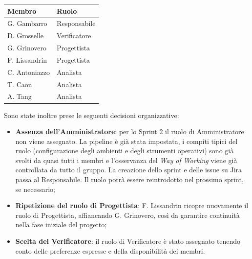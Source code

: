 \vspace{0.3cm}
\renewcommand{\arraystretch}{1.3}
\noindent
\begin{tabularx}{\textwidth}{|X|X|}
    \hline
    \textbf{Membro} & \textbf{Ruolo} \\
    \hline
    G. Gambarro & Responsabile \\
    \hline
    D. Grosselle & Verificatore \\
    \hline
    G. Grinovero & Progettista \\
    \hline
    F. Lissandrin & Progettista \\
    \hline
    C. Antoniazzo & Analista \\
    \hline
    T. Caon & Analista \\
    \hline
    A. Tang & Analista \\
    \hline
\end{tabularx}
\vspace{0.3cm}

\noindent Sono state inoltre prese le seguenti decisioni organizzative:
\begin{itemize}
    \item \textbf{Assenza dell'Amministratore}: per lo Sprint 2 il ruolo di Amministratore non viene assegnato. La pipeline è già stata impostata, i compiti tipici del ruolo (configurazione degli ambienti e degli strumenti operativi) sono già svolti da quasi tutti i membri e l'osservanza del \emph{Way of Working} viene già controllata da tutto il gruppo. La creazione dello sprint e delle issue su Jira passa al Responsabile. Il ruolo potrà essere reintrodotto nel prossimo sprint, se necessario;
    \item \textbf{Ripetizione del ruolo di Progettista}: F. Lissandrin ricopre nuovamente il ruolo di Progettista, affiancando G. Grinovero, così da garantire continuità nella fase iniziale del progetto;
    \item \textbf{Scelta del Verificatore}: il ruolo di Verificatore è stato assegnato tenendo conto delle preferenze espresse e della disponibilità dei membri.
\end{itemize}

